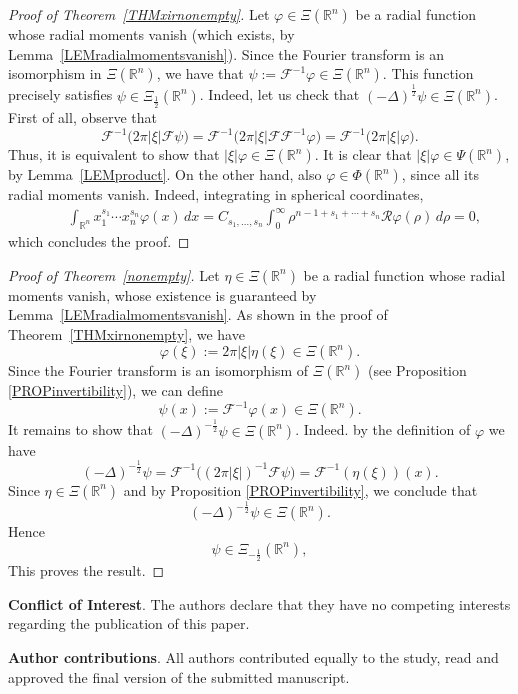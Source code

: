 \documentclass[reqno,11pt]{amsart}
\theoremstyle{definition}
\def\R{\mathbb{R}}
\begin{document}
\label{PAGproofxir}
\begin{proof}[Proof of Theorem~\ref{THMxirnonempty}]
	Let $\varphi\in \Xi(\R^n)$ be a radial function whose radial moments vanish (which exists, by Lemma~\ref{LEMradialmomentsvanish}). Since the Fourier transform is an isomorphism in $\Xi(\R^n)$, we have that $\psi:=\mathcal{F}^{-1}\varphi \in \Xi(\R^n)$. This function precisely satisfies $\psi\in \Xi_{\frac{1}{2}}(\mathbb{R}^n)$. Indeed, let us check that $(-\Delta)^\frac{1}{2}\psi\in \Xi(\R^n)$. First of all, observe that
	\[
		\mathcal{F}^{-1}\big( 2\pi |\xi| \mathcal{F} \psi\big) = \mathcal{F}^{-1}\big( 2\pi |\xi| \mathcal{F} \mathcal{F}^{-1}\varphi \big) = \mathcal{F}^{-1}\big( 2\pi |\xi| \varphi \big).
	\]
	Thus, it is equivalent to show that $|\xi| \varphi \in \Xi(\R^n)$. It is clear that $|\xi|\varphi\in \Psi( \R^n)$, by Lemma~\ref{LEMproduct}. On the other hand, also $\varphi\in \Phi(\R^n)$, since all its radial moments vanish. Indeed, integrating in spherical coordinates,
	\begin{align*}
		&\phantom{=}\int_{\R^n}x_1^{s_1}\cdots x_n^{s_n}\varphi(x)\, dx = C_{s_1,\ldots , s_n}\int_0^\infty \rho^{n-1+s_1+\cdots +s_n} \mathcal{R}\varphi(\rho)\, d\rho=0,
	\end{align*}
	which concludes the proof.
\end{proof}
\begin{proof}[Proof of Theorem~\ref{nonempty}]
Let $\eta\in \Xi(\R^n)$ be a radial function whose radial moments vanish, whose existence is guaranteed by Lemma~\ref{LEMradialmomentsvanish}. As shown in the proof of Theorem~\ref{THMxirnonempty}, we have
$$ \varphi(\xi):=2 \pi|\xi|\eta(\xi) \in \Xi(\R^n).$$
Since the Fourier transform is an isomorphism of $\Xi(\R^n)$ (see Proposition \ref{PROPinvertibility}), we can define
$$\psi(x):=\mathcal{F}^{-1}\varphi(x)\in\Xi(\R^n).$$
It remains to show that $(-\Delta)^{-\frac{1}{2}}\psi\in\Xi(\R^n)$. Indeed. by the definition of $\varphi$ we have
$$(-\Delta)^{-\frac12}\psi=\mathcal{F}^{-1}\big((2\pi|\xi|)^{-1}\mathcal{F}\psi\big)=\mathcal{F}^{-1}(\eta(\xi))(x).$$
Since $\eta\in\Xi(\R^n)$ and by Proposition \ref{PROPinvertibility}, we conclude that
$$(-\Delta)^{-\frac12}\psi\in\Xi(\R^n).$$
Hence
$$\psi\in\Xi_{-\frac12}(\R^n),$$
This proves the result.
\end{proof}


{\bf Conflict of Interest}. The authors declare that they have no competing interests regarding the publication of this paper.

{\bf Author contributions}. All authors contributed equally to the study, read and approved the final version of the submitted manuscript.
\end{document}
